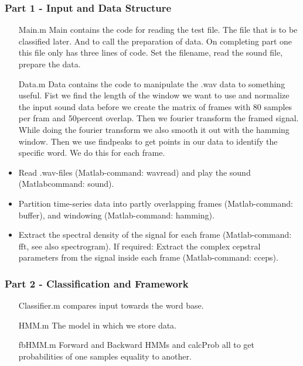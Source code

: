 \documentclass[titlepage]{article}
\begin{document}
	\subsubsection{Part 1 - Input and Data Structure}
\begin{itemize}
\item[Main.m] Main contains the code for reading the test file. The file that is to be classified later. And to call the preparation of data. On completing part one this file only has three lines of code. Set the filename, read the sound file, prepare the data. 
\item[Data.m] Data contains the code to manipulate the .wav data to something useful. Fist we find the length of the window we want to use and normalize the input sound data before we create the matrix of frames with 80 samples per fram and 50percent overlap. Then we fourier transform the framed signal. While doing the fourier transform we also smooth it out with the hamming window. Then we use findpeaks to get points in our data to identify the specific word. We do this for each frame.  
\end{itemize}

\begin{itemize}
\item Read .wav-ﬁles (Matlab-command: wavread) and play the sound (Matlabcommand: sound).
\item Partition time-series data into partly overlapping frames (Matlab-command: buffer), and windowing (Matlab-command: hamming).
\item Extract the spectral density of the signal for each frame (Matlab-command: fft, see also spectrogram). If required: Extract the complex cepstral parameters from the signal inside each frame (Matlab-command: cceps).
\end{itemize}

	\subsubsection{Part 2 - Classification and Framework}
\begin{itemize}
\item[Classifier.m] compares input towards the word base. 
\item[HMM.m] The model in which we store data.
\item[fbHMM.m] Forward and Backward HMMs and calcProb all to get probabilities of one samples equality to another.
\end{itemize}
\end{document}
